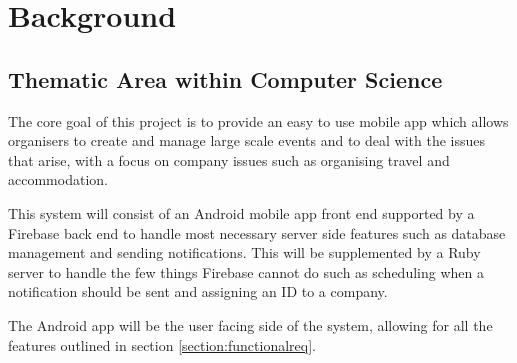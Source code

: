 \chapter{Background}
\label{chap:background}


\section{Thematic Area within Computer Science}
\label{thematicarea}


The core goal of this project is to provide an easy to use mobile app which allows organisers to create and manage large scale events and to deal with the issues that arise, with a focus on company issues such as organising travel and accommodation.

This system will consist of an Android mobile app front end supported by a Firebase back end to handle most necessary server side features such as database management and sending notifications. This will be supplemented by a Ruby server to handle the few things Firebase cannot do such as scheduling when a notification should be sent and assigning an ID to a company.

The Android app will be the user facing side of the system, allowing for all the features outlined in section \ref{section:functionalreq}.

